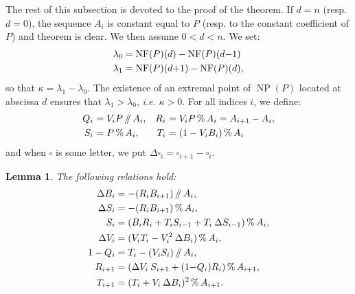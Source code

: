 \documentclass{sig-alternate-05-2015}
\DeclareMathOperator{\NP}{NP}
\newcommand{\NF}{\text{\rm NF}}
\renewcommand{\mod}{\,\%\,}
\renewcommand{\div}{\,/\hspace{-0.3em}/\,}
\newtheorem{lem}[theo]{Lemma}
\theoremstyle{definition}
\begin{document}
The rest of this subsection is devoted to the proof of the theorem.
If $d = n$ (resp. $d = 0$), the sequence $A_i$ is constant equal to
$P$ (resp. to the constant coefficient of $P$) and theorem is clear.
We then assume $0 < d < n$. We set:
\begin{align*}
\lambda_0 & = \NF(P)(d) - \NF(P)(d{-}1) \\
\lambda_1 & = \NF(P)(d{+}1) - \NF(P)(d),
\end{align*}
so that $\kappa = \lambda_1 - \lambda_0$.
The existence of an extremal point of $\NP(P)$ located at abscissa
$d$ ensures that $\lambda_1 > \lambda_0$, \emph{i.e.} $\kappa > 0$.
For all indices $i$, we define:
$$\begin{array}{r@{\,\,}lr@{\,\,}l}
Q_i &= V_i P \div A_i, &
R_i & = V_i P \mod A_i = A_{i+1} - A_i, 
\smallskip \\
S_i &= P \mod A_i, &
T_i &= (1 - V_i B_i) \mod A_i
\end{array}$$
and when $\square$ is some letter, we put $\Delta \square_i = \square_{i+1} 
- \square_i$.

\begin{lem} \label{lem:formulae}
The following relations hold:
\begin{align}
\Delta B_i &= -(R_i B_{i+1}) \div A_i, \label{eqdef:Biminus} \\
\Delta S_i &= -(R_i B_{i+1}) \mod A_i,  \label{eqdef:Siminus} \\
S_{i} &= (B_i R_i + T_i S_{i-1} + T_i \: \Delta S_{i-1}) \mod A_{i}, \label{eqdef:Si2}  \\
\Delta V_i &= (V_i T_i - V_i^2 \: \Delta B_i) \mod A_{i}, \label{eqdef:Viminus}\\
1-Q_i &= T_i - (V_i S_i) \div A_i, \label{eqdef:Qiminus}\\
R_{i+1} &= (\Delta V_i \: S_{i+1}+(1{-}Q_i)R_i) \mod A_{i+1}, \label{eq:Riplus}\\
T_{i+1} &= (T_i + V_i \: \Delta B_i)^2 \mod{A_{i+1}}. \label{eq:ViBiplus}
\end{align}
\end{lem}
\end{document}
